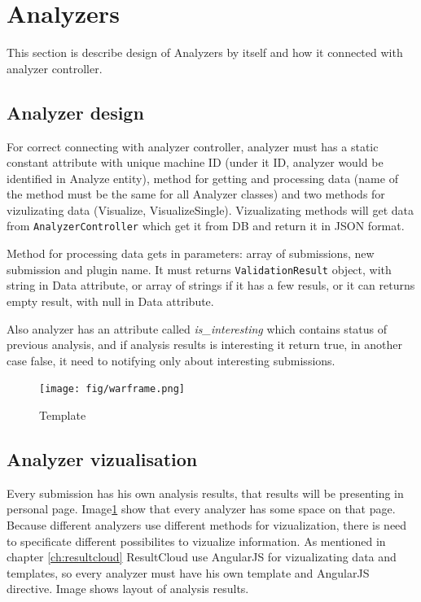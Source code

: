 \section{Analyzers}

This section is describe design of Analyzers by itself and how it connected with analyzer controller.

\subsection{Analyzer design}

For correct connecting with analyzer controller, analyzer must has a static constant attribute with unique machine ID (under it ID, analyzer would be identified in Analyze entity), method for getting and processing data (name of the method must be the same for all Analyzer classes) and two methods for vizulizating data (Visualize, VisualizeSingle). Vizualizating methods will get data from \texttt{AnalyzerController} which get it from DB and return it in JSON format.

Method for processing data gets in parameters: array of submissions, new submission and plugin name. It must returns \texttt{ValidationResult} object, with string in Data attribute, or array of strings if it has a few resuls, or it can returns empty result, with null in Data attribute.

Also analyzer has an attribute called \emph{is\_interesting} which contains status of previous analysis, and if analysis results is interesting it return true, in another case false, it need to notifying only about interesting submissions.

\begin{figure}
  \centering
    \texttt{[image: fig/warframe.png]}
  \caption{Template}
  \label{fig:temp}
\end{figure}

\subsection{Analyzer vizualisation}

Every submission has his own analysis results, that results will be presenting in personal page. Image\ref{fig:temp} show that every analyzer has some space on that page. Because different analyzers use different methods for vizualization, there is need to specificate different possibilites to vizualize information. As mentioned in chapter \ref{ch:resultcloud} ResultCloud use AngularJS for vizualizating data and templates, so every analyzer must have his own template and AngularJS  directive. Image shows layout of analysis results.

